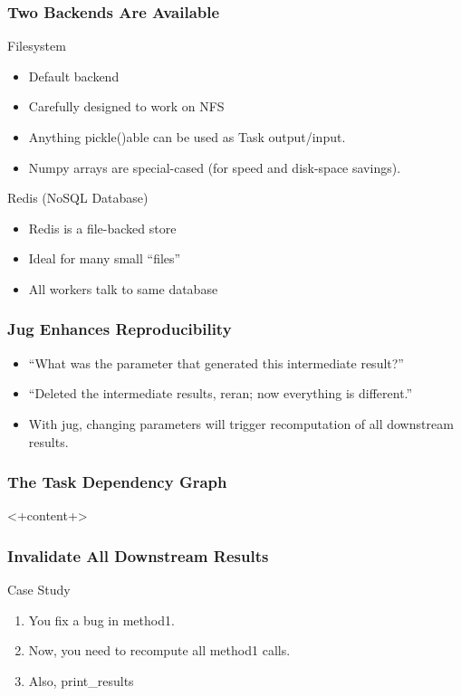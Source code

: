 \documentclass{beamer}
\begin{document}
\begin{frame}[fragile]
\frametitle{Two Backends Are Available}
\begin{block}{Filesystem}
\begin{itemize}
\item Default backend
\item Carefully designed to work on NFS
\item Anything pickle()able can be used as Task output/input.
\item Numpy arrays are special-cased (for speed and disk-space savings).
\end{itemize}
\end{block}

\begin{block}{Redis (NoSQL Database)}
\begin{itemize}
\item Redis is a file-backed store
\item Ideal for many small ``files''
\item All workers talk to same database
\end{itemize}
\end{block}

\end{frame}

\begin{frame}[fragile]
\frametitle{Jug Enhances Reproducibility}

\begin{itemize}
\item ``What was the parameter that generated this intermediate result?''
\item ``Deleted the intermediate results, reran; now everything is different.''
\end{itemize}

\begin{itemize}
\item With jug, changing parameters \alert{will trigger recomputation of all
downstream results}.
\end{itemize}

\end{frame}


\begin{frame}[fragile]
\frametitle{The Task Dependency Graph}
<+content+>
\end{frame}

\begin{frame}[fragile]
\frametitle{Invalidate All Downstream Results}
\begin{block}{Case Study}
\begin{enumerate}
\item You fix a bug in \alert{method1}.
\item Now, you need to recompute all \alert{method1} calls.
\item Also, \alert{print\_results}
\end{enumerate}
\end{block}
\end{frame}
\end{document}
